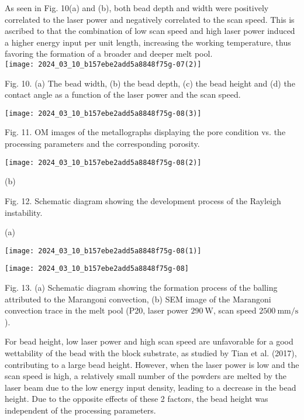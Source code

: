 \documentclass[10pt]{article}
\begin{document}
As seen in Fig. 10(a) and (b), both bead depth and width were positively correlated to the laser power and negatively correlated to the scan speed. This is ascribed to that the combination of low scan speed and high laser power induced a higher energy input per unit length, increasing the working temperature, thus favoring the formation of a broader and deeper melt pool.\\
\texttt{[image: 2024\_03\_10\_b157ebe2add5a8848f75g-07(2)]}

Fig. 10. (a) The bead width, (b) the bead depth, (c) the bead height and (d) the contact angle as a function of the laser power and the scan speed.

\begin{center}
\texttt{[image: 2024\_03\_10\_b157ebe2add5a8848f75g-08(3)]}
\end{center}

Fig. 11. OM images of the metallographs displaying the pore condition vs. the processing parameters and the corresponding porosity.

\begin{center}
\texttt{[image: 2024\_03\_10\_b157ebe2add5a8848f75g-08(2)]}
\end{center}

(b)

Fig. 12. Schematic diagram showing the development process of the Rayleigh instability.

(a)

\begin{center}
\texttt{[image: 2024\_03\_10\_b157ebe2add5a8848f75g-08(1)]}
\end{center}

\begin{center}
\texttt{[image: 2024\_03\_10\_b157ebe2add5a8848f75g-08]}
\end{center}

Fig. 13. (a) Schematic diagram showing the formation process of the balling attributed to the Marangoni convection, (b) SEM image of the Marangoni convection trace in the melt pool (P20, laser power $290 \mathrm{~W}$, scan speed $2500 \mathrm{~mm} / \mathrm{s}$ ).

For bead height, low laser power and high scan speed are unfavorable for a good wettability of the bead with the block substrate, as studied by Tian et al. (2017), contributing to a large bead height. However, when the laser power is low and the scan speed is high, a relatively small number of the powders are melted by the laser beam due to the low energy input density, leading to a decrease in the bead height. Due to the opposite effects of these 2 factors, the bead height was independent of the processing parameters.
\end{document}
